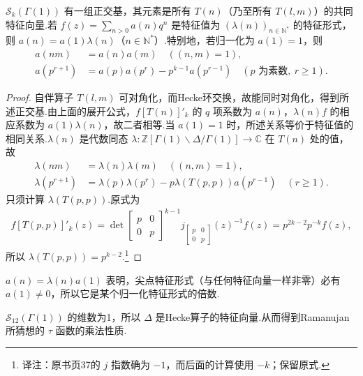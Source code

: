 \begin{corollary*}

$\mathcal S_k(\Gamma(1))$ 有一组正交基，其元素是所有 $T(n)$（乃至所有 $T(l,m)$）的共同特征向量.若 $f(z)=\sum_{n>0}a(n)q^n$ 是特征值为 $(\lambda(n))_{n\in\mathbb N^*}$ 的特征形式，则 $a(n)=a(1)\lambda(n)$（$n\in\mathbb N^*$）.特别地，若归一化为 $a(1)=1$，则
\begin{align*}
a(nm)&=a(n)a(m)\quad((n,m)=1),\\
a(p^{r+1})&=a(p)a(p^r)-p^{k-1}a(p^{r-1})\quad(p\text{ 为素数},\ r\ge1).
\end{align*}
\end{corollary*}

\begin{proof}

自伴算子 $T(l,m)$ 可对角化，而Hecke环交换，故能同时对角化，得到所述正交基.由上面的展开公式，$f[T(n)]'_k$ 的 $q$ 项系数为 $a(n)$，$\lambda(n)f$ 的相应系数为 $a(1)\lambda(n)$，故二者相等.当 $a(1)=1$ 时，所述关系等价于特征值的相同关系.$\lambda(n)$ 是代数同态 $\lambda:\mathbb Z[\Gamma(1)\backslash\Delta/\Gamma(1)]\to\mathbb C$ 在 $T(n)$ 处的值，故
\begin{align*}
\lambda(nm)&=\lambda(n)\lambda(m)\quad((n,m)=1),\\
\lambda(p^{r+1})&=\lambda(p)\lambda(p^r)-p\lambda(T(p,p))a(p^{r-1})\quad(r\ge1).
\end{align*}
只须计算 $\lambda(T(p,p))$.原式为
\begin{align*}
f[T(p,p)]'_k(z)=\det\begin{bmatrix}p&0\\0&p\end{bmatrix}^{k-1}j_{\left[\begin{smallmatrix}p&0\\0&p\end{smallmatrix}\right]}(z)^{-1}f(z)=p^{2k-2}p^{-k}f(z),
\end{align*}
所以 $\lambda(T(p,p))=p^{k-2}$.\footnote{译注：原书页37的 $j$ 指数确为 $-1$，而后面的计算使用 $-k$；保留原式.}

\end{proof}

\begin{remark*}

$a(n)=\lambda(n)a(1)$ 表明，尖点特征形式（与任何特征向量一样非零）必有 $a(1)\ne0$，所以它是某个归一化特征形式的倍数.

\end{remark*}

\begin{example*}

$\mathcal S_{12}(\Gamma(1))$ 的维数为1，所以 $\Delta$ 是Hecke算子的特征向量.从而得到Ramanujan所猜想的 $\tau$ 函数的乘法性质.

\end{example*}

